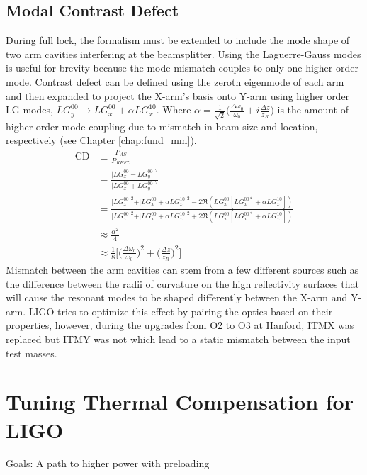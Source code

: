 	\subsection{Modal Contrast Defect}
	During full lock, the formalism must be extended to include the mode shape of two arm cavities interfering at the beamsplitter. Using the Laguerre-Gauss modes is useful for brevity because the mode mismatch couples to only one higher order mode. Contrast defect can be defined using the zeroth eigenmode of each arm and then expanded to project the X-arm's basis onto Y-arm using higher order LG modes, $LG^{00}_y \rightarrow  LG^{00}_x + \alpha LG^{10}_x$.  Where $\alpha = \frac{1}{\sqrt{2}} \big(\frac{\Delta \omega_{0}}{\omega_{0}} + i \frac{\Delta z }{z_R}\big)$ is the amount of higher order mode coupling due to mismatch in beam size and location, respectively (see Chapter \ref{chap:fund_mm}).
	\begin{equation}\label{CD_mode}
	\begin{aligned}
	\text{CD} 	&\equiv \frac{P_{AS}}{P_{REFL}} \\
	&= \frac{\vert LG^{00}_x - LG^{00}_y \vert^2}{\vert LG^{00}_x + LG^{00}_y \vert^2}\\
	&= \frac{\vert LG^{00}_x \vert^2 + \vert LG^{00}_x + \alpha LG^{10}_x \vert^2 - 2\Re(LG^{00}_x [LG^{00*}_x + \alpha LG^{10}_x ])}{\vert LG^{00}_x \vert^2 + \vert LG^{00}_x + \alpha LG^{10}_x \vert^2 + 2\Re(LG^{00}_x [LG^{00*}_x + \alpha LG^{10}_x ])}\\
	&\approx \frac{\alpha^2}{4}\\
	&\approx \frac{1}{8} \bigg[ \bigg(\frac{\Delta\omega_{0}}{\omega_{0}} \bigg)^2+  \bigg(\frac{ \Delta z }{z_R}\bigg)^2 \bigg]
	\end{aligned}
	\end{equation}
	Mismatch between the arm cavities can stem from a few different sources such as the difference between the radii of curvature on the high reflectivity surfaces that will cause the resonant modes to be shaped differently between the X-arm and Y-arm. LIGO tries to optimize this effect by pairing the optics based on their properties, however, during the upgrades from O2 to O3 at Hanford, ITMX was replaced but ITMY was not which lead to a static mismatch between the input test masses.
	
	\section{Tuning Thermal Compensation for LIGO}
	Goals: A path to higher power with preloading \cite{winkler_thermaldist} \cite{Strain_TL}
	
